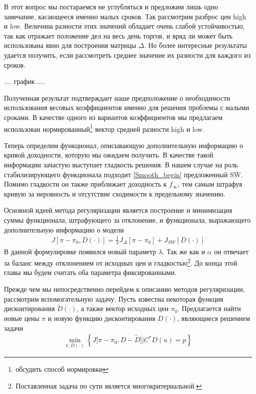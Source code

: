 \documentclass[10pt]{article}
\theoremstyle{definition}
\theoremstyle{remark}
\theoremstyle{plain}
\newcommand{\wt}{\widetilde}
\newcommand{\w}{f_\infty}
\begin{document}
В этот вопрос мы постараемся не углубляться и предложим лишь одно замечание, касающееся именно малых сроков. Так рассмотрим разброс цен high и low. Величина разности этих значений обладает очень слабой устойчивостью, так как отражает положение дел на весь день торгов, и вряд ли может быть использована явно для построения матрицы $\Delta$. Но более интересные результаты удается получить, если рассмотреть среднее значение их разности для каждого из сроков.

....
график
....

Полученная результат подтверждает наше предположение о необходимости использования весовых коэффициентов именно для решения проблемы с малыми сроками. В качестве одного из вариантов коэффициентов мы предлагаем использован нормированный\footnote{обсудить способ нормировки} вектор средней разности high и low.


Теперь определим функционал, описывающую дополнительную информацию о кривой доходности, которую мы ожидаем получить. В качестве такой информации зачастую выступает  гладкость решения. В нашем случае на роль стабилизирующего функционала подходит \eqref{Smooth_begin} предложенный SW. Помимо гладкости он также приближает доходность к $\w$, тем самым штрафуя кривую за неровность и отсутствие сходимости к предельному значению. 
 
 Основной идеей метода регуляризации является построение и минимизация суммы функционала, штрафующего за отклонение, и функционала, выражающего дополнительную информацию о модели
\begin{align*}
J\left[\pi - \pi_0, D(\cdot)\right] = \frac{1}{\lambda}J_\Delta[\pi-\pi_0] + J_{SW}[D(\cdot)]
\end{align*}
В данной формулировке появился новый параметр $\lambda$. Так же как и $\alpha$ он отвечает за баланс между отклонением от исходных цен и гладкостью\footnote{Поставленная задача по сути является многокритериальной.}.  До конца этой главы мы будем считать оба параметра фиксированными.

Прежде чем мы непосредственно перейдем к описанию методов регуляризации, рассмотрим вспомогательную задачу.
Пусть известна некоторая функция дисконтирования $\wt{D}(\cdot)$, а также вектор исходных цен $\pi_0$. Предлагается найти новые цены $\pi$ и новую функцию дисконтирования $D(\cdot)$, являющиеся решением задачи
\begin{align}
\min\limits_{\pi,D(\cdot)}
\left\{
	J\bigl[\pi-\pi_0,D - \wt{D}\bigr]
	\Big|
	C^*D(u) = p 
\right\}
\end{align}
\end{document}
